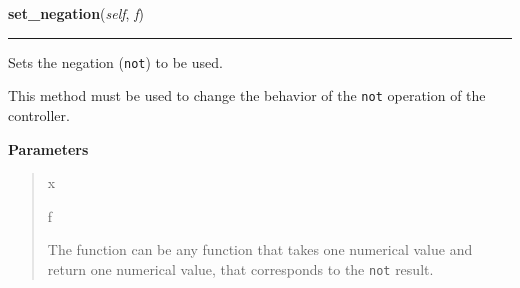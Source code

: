     \begin{boxedminipage}{\textwidth}

    \raggedright \textbf{set\_negation}(\textit{self}, \textit{f})

    \vspace{-1.5ex}

    \rule{\textwidth}{0.5\fboxrule}

Sets the negation (\texttt{not}) to be used.

This method must be used to change the behavior of the \texttt{not} operation
of the controller.
    \vspace{1ex}

      \textbf{Parameters}
      \begin{quote}
        \begin{Ventry}{x}

          \item[f]


The function can be any function that takes one numerical value and
return one numerical value, that corresponds to the \texttt{not} result.
        \end{Ventry}

      \end{quote}

    \vspace{1ex}

    \end{boxedminipage}

    \label{peach:fuzzy:control:Controller:set_norm}

    \vspace{0.5ex}

